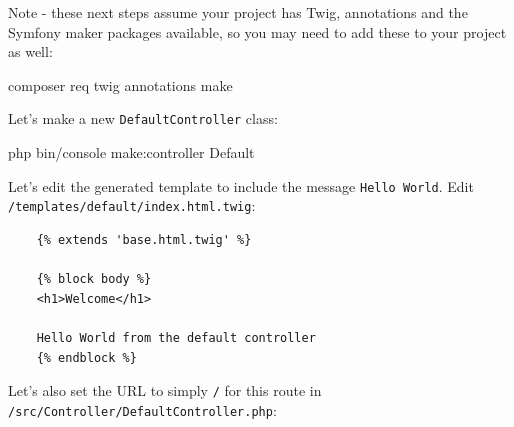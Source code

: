 \documentclass[a4paperpaper,openright]{book}
\newenvironment{Shaded}{}{}
\newcommand{\AnnotationTok}[1]{\textcolor[rgb]{0.38,0.63,0.69}{\textbf{\textit{#1}}}}
\newcommand{\CommentTok}[1]{\textcolor[rgb]{0.38,0.63,0.69}{\textit{#1}}}
\newcommand{\ExtensionTok}[1]{#1}
\newcommand{\KeywordTok}[1]{\textcolor[rgb]{0.00,0.44,0.13}{\textbf{#1}}}
\newcommand{\NormalTok}[1]{#1}
\newcommand{\OtherTok}[1]{\textcolor[rgb]{0.00,0.44,0.13}{#1}}
\newcommand{\StringTok}[1]{\textcolor[rgb]{0.25,0.44,0.63}{#1}}
\begin{document}
Note - these next steps assume your project has Twig, annotations and
the Symfony maker packages available, so you may need to add these to
your project as well:

\begin{Shaded}
\begin{Highlighting}[]
    \ExtensionTok{composer}\NormalTok{ req twig annotations make}
\end{Highlighting}
\end{Shaded}

Let's make a new \texttt{DefaultController} class:

\begin{Shaded}
\begin{Highlighting}[]
    \ExtensionTok{php}\NormalTok{ bin/console make:controller Default}
\end{Highlighting}
\end{Shaded}

Let's edit the generated template to include the message
\texttt{Hello\ World}. Edit \texttt{/templates/default/index.html.twig}:

\begin{verbatim}
    {% extends 'base.html.twig' %}

    {% block body %}
    <h1>Welcome</h1>

    Hello World from the default controller
    {% endblock %}
\end{verbatim}

Let's also set the URL to simply \texttt{/} for this route in
\texttt{/src/Controller/DefaultController.php}:

\begin{Shaded}
\end{Shaded}
\end{document}
